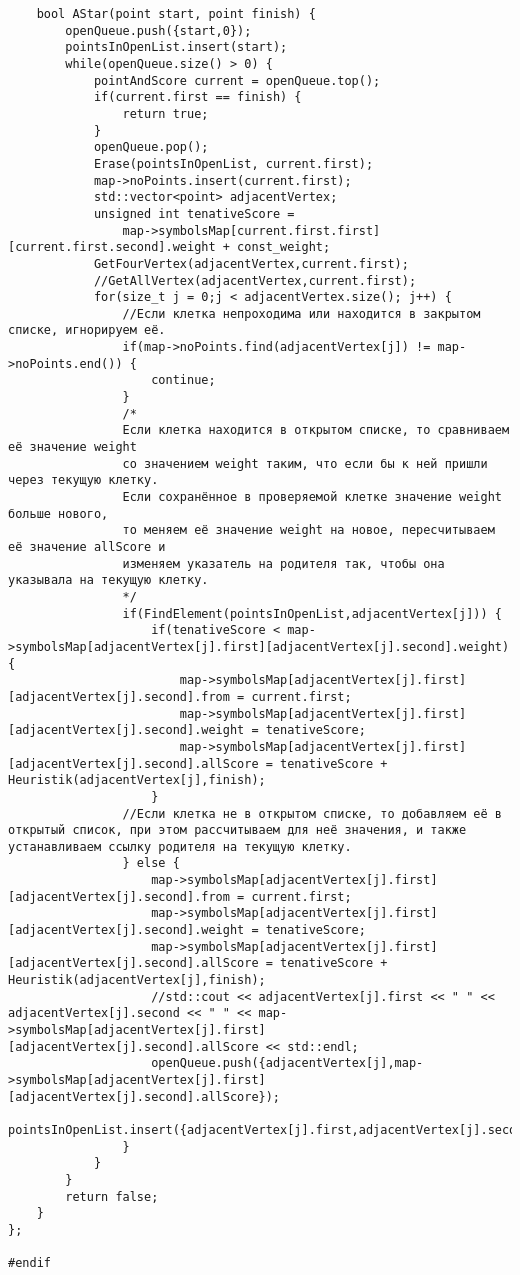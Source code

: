 \documentclass[12pt]{article}
\begin{document}
\begin{verbatim}
    bool AStar(point start, point finish) {
        openQueue.push({start,0});
        pointsInOpenList.insert(start);
        while(openQueue.size() > 0) {
            pointAndScore current = openQueue.top();
            if(current.first == finish) {
                return true;
            }
            openQueue.pop();
            Erase(pointsInOpenList, current.first);
            map->noPoints.insert(current.first);
            std::vector<point> adjacentVertex;
            unsigned int tenativeScore = 
                map->symbolsMap[current.first.first][current.first.second].weight + const_weight;
            GetFourVertex(adjacentVertex,current.first);
            //GetAllVertex(adjacentVertex,current.first);
            for(size_t j = 0;j < adjacentVertex.size(); j++) {
                //Если клетка непроходима или находится в закрытом списке, игнорируем её.
                if(map->noPoints.find(adjacentVertex[j]) != map->noPoints.end()) {
                    continue;
                }
                /*
                Если клетка находится в открытом списке, то сравниваем её значение weight
                со значением weight таким, что если бы к ней пришли через текущую клетку.
                Если сохранённое в проверяемой клетке значение weight больше нового,
                то меняем её значение weight на новое, пересчитываем её значение allScore и
                изменяем указатель на родителя так, чтобы она указывала на текущую клетку.
                */
                if(FindElement(pointsInOpenList,adjacentVertex[j])) {
                    if(tenativeScore < map->symbolsMap[adjacentVertex[j].first][adjacentVertex[j].second].weight) {
                        map->symbolsMap[adjacentVertex[j].first][adjacentVertex[j].second].from = current.first;
                        map->symbolsMap[adjacentVertex[j].first][adjacentVertex[j].second].weight = tenativeScore;
                        map->symbolsMap[adjacentVertex[j].first][adjacentVertex[j].second].allScore = tenativeScore + Heuristik(adjacentVertex[j],finish); 
                    }
                //Если клетка не в открытом списке, то добавляем её в открытый список, при этом рассчитываем для неё значения, и также устанавливаем ссылку родителя на текущую клетку.
                } else {
                    map->symbolsMap[adjacentVertex[j].first][adjacentVertex[j].second].from = current.first;
                    map->symbolsMap[adjacentVertex[j].first][adjacentVertex[j].second].weight = tenativeScore;
                    map->symbolsMap[adjacentVertex[j].first][adjacentVertex[j].second].allScore = tenativeScore + Heuristik(adjacentVertex[j],finish);
                    //std::cout << adjacentVertex[j].first << " " << adjacentVertex[j].second << " " << map->symbolsMap[adjacentVertex[j].first][adjacentVertex[j].second].allScore << std::endl;
                    openQueue.push({adjacentVertex[j],map->symbolsMap[adjacentVertex[j].first][adjacentVertex[j].second].allScore});
                    pointsInOpenList.insert({adjacentVertex[j].first,adjacentVertex[j].second});
                }
            }
        }
        return false; 
    }
};

#endif
\end{verbatim}
\end{document}
